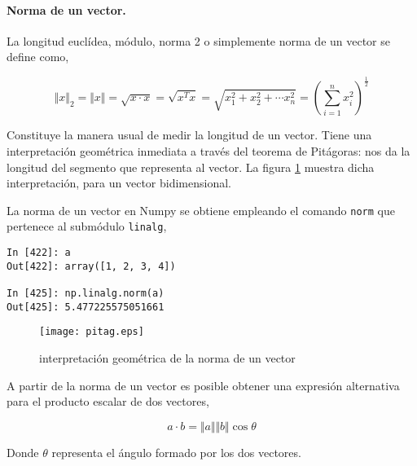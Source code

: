 \begin{paracol}{2}
\paragraph{Norma de un vector.} La longitud euclídea, módulo,  norma 2 o simplemente norma  de un vector se define como,
\end{paracol}
\begin{equation*}
\Vert x \Vert_2 =\Vert x \Vert =\sqrt{x\cdot x}=\sqrt{x^Tx}=\sqrt{x_1^2+x_2^2+\cdots x_n^2}=\left( \sum_{i=1}^nx_i^2 \right)^\frac{1}{2}
\end{equation*}
\begin{paracol}{2}
Constituye la manera usual de medir la longitud de un vector. Tiene una interpretación geométrica inmediata a través del teorema de Pitágoras: nos da la longitud del segmento que representa al vector. La figura \ref{fig:pitag} muestra dicha interpretación, para un vector bidimensional.

La norma de un vector en Numpy se obtiene empleando el  comando \texttt{norm} que pertenece al submódulo \texttt{linalg}, 
\end{paracol}
\begin{center}
    \begin{minipage}{0.3\textwidth}
        \begin{verbatim}
In [422]: a
Out[422]: array([1, 2, 3, 4])

In [425]: np.linalg.norm(a)
Out[425]: 5.477225575051661
\end{verbatim}
\end{minipage}
\end{center}

\begin{figure}[h]
\centering
\texttt{[image: pitag.eps]}
\caption{interpretación geométrica de la norma de un vector}
\label{fig:pitag}
\end{figure}
\begin{paracol}{2}
A partir de la norma de un vector es posible obtener una expresión alternativa para el producto escalar de dos vectores,
\end{paracol}
\begin{equation*}
a\cdot b=\Vert a \Vert \Vert b \Vert \cos \theta
\end{equation*}
\begin{paracol}{2}
Donde $\theta$ representa el ángulo formado por los dos vectores.
\end{paracol}

